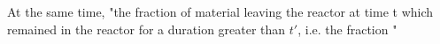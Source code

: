 At the same time, "the fraction of material leaving the reactor at time t which remained in the reactor for a duration greater than $t'$, i.e. the fraction "  